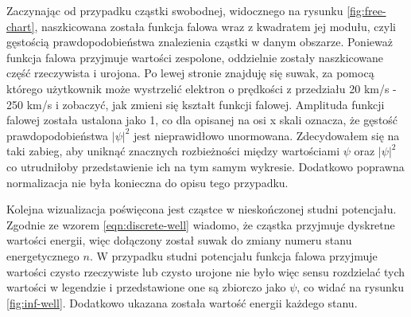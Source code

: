 \documentclass{SGGW-thesis}
\begin{document}
	Zaczynając od przypadku cząstki swobodnej, widocznego na rysunku \ref{fig:free-chart}, naszkicowana została funkcja falowa wraz z kwadratem jej modułu, czyli gęstością prawdopodobieństwa znalezienia cząstki w danym obszarze. Ponieważ funkcja falowa przyjmuje wartości zespolone, oddzielnie zostały naszkicowane część rzeczywista i urojona. Po lewej stronie znajduję się suwak, za pomocą którego użytkownik może wystrzelić elektron o prędkości z przedziału 20 km/s - 250 km/s i zobaczyć, jak zmieni się kształt funkcji falowej. Amplituda funkcji falowej została ustalona jako 1, co dla opisanej na osi x skali oznacza, że gęstość prawdopodobieństwa $|\psi|^2$ jest nieprawidłowo unormowana. Zdecydowałem się na taki zabieg, aby uniknąć znacznych rozbieżności między wartościami $\psi$ oraz $|\psi|^2$ co utrudniłoby przedstawienie ich na tym samym wykresie. Dodatkowo poprawna normalizacja nie była konieczna do opisu tego przypadku. 
	
	Kolejna wizualizacja poświęcona jest cząstce w nieskończonej studni potencjału. Zgodnie ze wzorem \ref{eqn:discrete-well} wiadomo, że cząstka przyjmuje dyskretne wartości energii, więc dołączony został suwak do zmiany numeru stanu energetycznego $n$. W przypadku studni potencjału funkcja falowa przyjmuje wartości czysto rzeczywiste lub czysto urojone nie było więc sensu rozdzielać tych wartości w legendzie i przedstawione one są zbiorczo jako $\psi$, co widać na rysunku \ref{fig:inf-well}. Dodatkowo ukazana została wartość energii każdego stanu.
	
\end{document}
